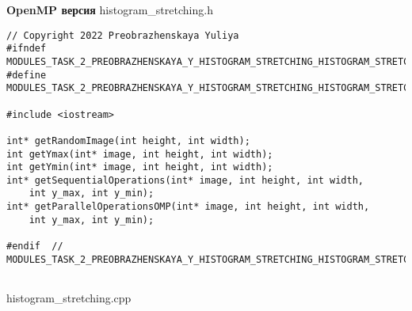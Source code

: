 \documentclass{report}
\begin{document}
\textbf{OpenMP версия}
\newline
\newline histogram\_stretching.h
\begin{lstlisting}
// Copyright 2022 Preobrazhenskaya Yuliya
#ifndef MODULES_TASK_2_PREOBRAZHENSKAYA_Y_HISTOGRAM_STRETCHING_HISTOGRAM_STRETCHING_H_
#define MODULES_TASK_2_PREOBRAZHENSKAYA_Y_HISTOGRAM_STRETCHING_HISTOGRAM_STRETCHING_H_

#include <iostream>

int* getRandomImage(int height, int width);
int getYmax(int* image, int height, int width);
int getYmin(int* image, int height, int width);
int* getSequentialOperations(int* image, int height, int width,
    int y_max, int y_min);
int* getParallelOperationsOMP(int* image, int height, int width,
    int y_max, int y_min);

#endif  // MODULES_TASK_2_PREOBRAZHENSKAYA_Y_HISTOGRAM_STRETCHING_HISTOGRAM_STRETCHING_H_


\end{lstlisting}
histogram\_stretching.cpp
\end{document}
